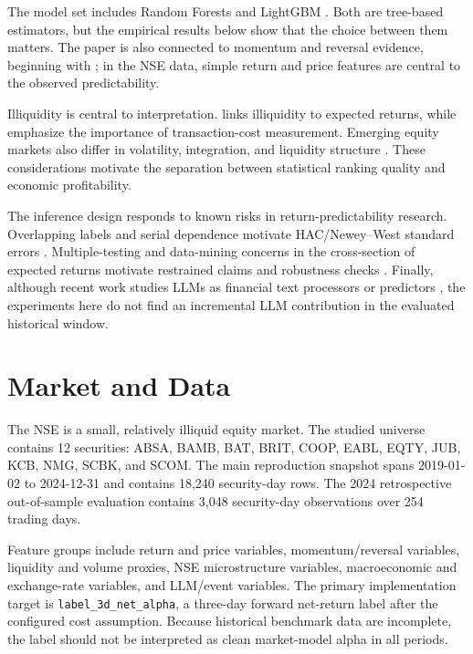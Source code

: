 \documentclass[11pt,a4paper]{article}
\begin{document}
The model set includes Random Forests \citep{breiman2001random} and LightGBM
\citep{ke2017lightgbm}.  Both are tree-based estimators, but the empirical
results below show that the choice between them matters.  The paper is also
connected to momentum and reversal evidence, beginning with
\citet{jegadeesh1993returns}; in the NSE data, simple return and price
features are central to the observed predictability.

Illiquidity is central to interpretation.  \citet{amihud2002illiquidity}
links illiquidity to expected returns, while \citet{lesmond1999transaction}
emphasize the importance of transaction-cost measurement.  Emerging equity
markets also differ in volatility, integration, and liquidity structure
\citep{bekaert1997emerging}.  These considerations motivate the separation
between statistical ranking quality and economic profitability.

The inference design responds to known risks in return-predictability
research.  Overlapping labels and serial dependence motivate HAC/Newey--West
standard errors \citep{newey1987simple}.  Multiple-testing and data-mining
concerns in the cross-section of expected returns motivate restrained claims
and robustness checks \citep{harvey2016cross}.  Finally, although recent work
studies LLMs as financial text processors or predictors
\citep{lopezlira2023chatgpt}, the experiments here do not find an incremental
LLM contribution in the evaluated historical window.

\section{Market and Data}
\label{sec:data}

The NSE is a small, relatively illiquid equity market.  The studied universe
contains 12 securities: ABSA, BAMB, BAT, BRIT, COOP, EABL, EQTY, JUB, KCB,
NMG, SCBK, and SCOM.  The main reproduction snapshot spans 2019-01-02 to
2024-12-31 and contains 18,240 security-day rows.  The 2024 retrospective
out-of-sample evaluation contains 3,048 security-day observations over 254
trading days.



Feature groups include return and price variables, momentum/reversal
variables, liquidity and volume proxies, NSE microstructure variables,
macroeconomic and exchange-rate variables, and LLM/event variables.  The
primary implementation target is \texttt{label\_3d\_net\_alpha}, a three-day
forward net-return label after the configured cost assumption.  Because
historical benchmark data are incomplete, the label should not be interpreted
as clean market-model alpha in all periods.
\end{document}
